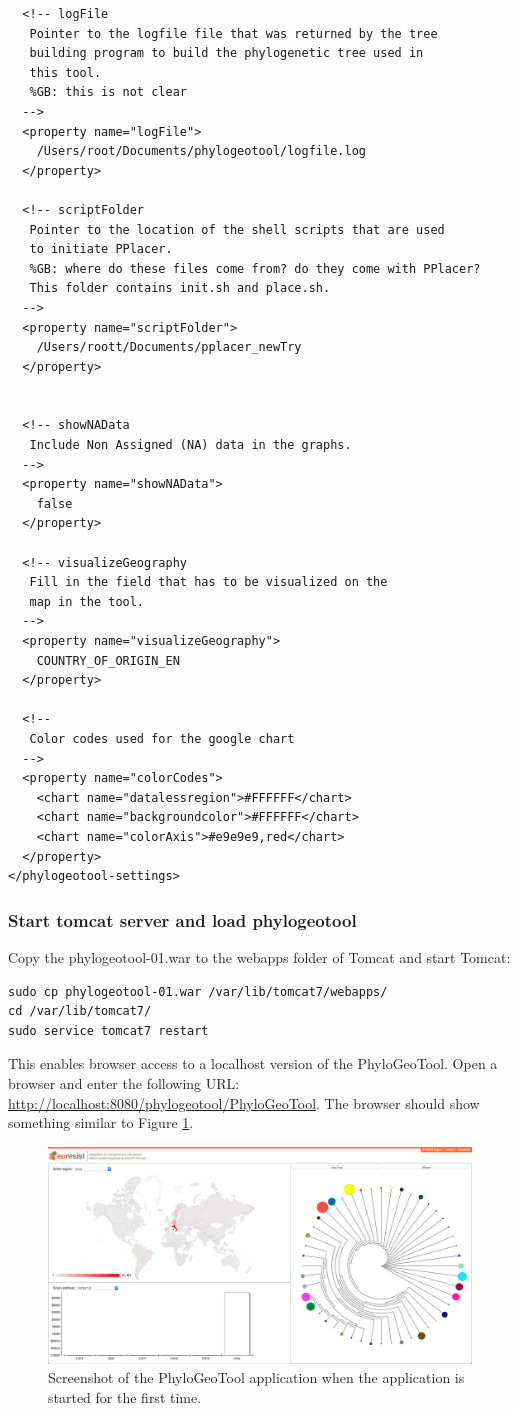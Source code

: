 \documentclass[a4paper, 11pt]{article} %
\begin{document}
\begin{verbatim}
  <!-- logFile
   Pointer to the logfile file that was returned by the tree 
   building program to build the phylogenetic tree used in 
   this tool.
   %GB: this is not clear
  -->
  <property name="logFile">
    /Users/root/Documents/phylogeotool/logfile.log
  </property>

  <!-- scriptFolder
   Pointer to the location of the shell scripts that are used 
   to initiate PPlacer.
   %GB: where do these files come from? do they come with PPlacer?
   This folder contains init.sh and place.sh.
  -->
  <property name="scriptFolder">
    /Users/roott/Documents/pplacer_newTry
  </property>


  <!-- showNAData 
   Include Non Assigned (NA) data in the graphs.
  -->
  <property name="showNAData">
    false
  </property>
  
  <!-- visualizeGeography 
   Fill in the field that has to be visualized on the 
   map in the tool.
  -->
  <property name="visualizeGeography">
  	COUNTRY_OF_ORIGIN_EN
  </property>

  <!-- 
   Color codes used for the google chart
  -->
  <property name="colorCodes">
    <chart name="datalessregion">#FFFFFF</chart>
    <chart name="backgroundcolor">#FFFFFF</chart>    
    <chart name="colorAxis">#e9e9e9,red</chart>
  </property>
</phylogeotool-settings>
\end{verbatim}


\subsubsection{Start tomcat server and load phylogeotool}

Copy the phylogeotool-01.war to the webapps folder of Tomcat and start Tomcat:
\begin{verbatim}
sudo cp phylogeotool-01.war /var/lib/tomcat7/webapps/
cd /var/lib/tomcat7/
sudo service tomcat7 restart
\end{verbatim}
This enables browser access to a localhost version of the PhyloGeoTool.
Open a browser and enter the following URL: \url{http://localhost:8080/phylogeotool/PhyloGeoTool}.
The browser should show something similar to Figure \ref{fig:01}.


\begin{figure}[!htbp]
\includegraphics[scale=0.19]{images/defaultScreenshot.png}
\caption{Screenshot of the PhyloGeoTool application when the application is started for the first time.}
\label{fig:01} 
\end{figure}
\end{document}

